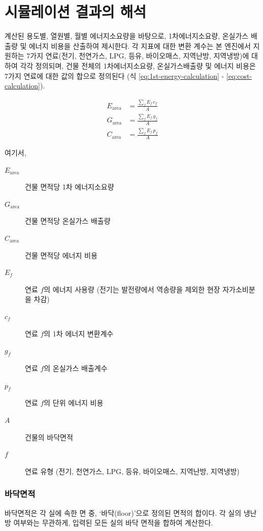 \chapter{시뮬레이션 결과의 해석}

\simulator\은 계산된 용도별, 열원별, 월별 에너지소요량을 바탕으로, 1차에너지소요량, 온실가스 배출량 및 에너지 비용을 산출하여 제시한다. 각 지표에 대한 변환 계수는 본 엔진에서 지원하는 7가지 연료(전기, 천연가스, LPG, 등유, 바이오매스, 지역난방, 지역냉방)에 대하여 각각 정의되며, 건물 전체의 1차에너지소요량, 온실가스배출량 및 에너지 비용은 7가지 연료에 대한 값의 합으로 정의된다 (식 \ref{eq:1st-energy-calculation} - \ref{eq:cost-calculation}).

\begin{align}
E_{\mathrm{area}} &= \frac{\sum_{f} E_f \, c_f}{A} \label{eq:1st-energy-calculation} \\
G_{\mathrm{area}} &= \frac{\sum_{f} E_f \, g_f}{A} \label{eq:ghg-calculation} \\
C_{\mathrm{area}} &= \frac{\sum_{f} E_f \, p_f}{A} \label{eq:cost-calculation}
\end{align}

여기서,

\begin{description}
\item[$E_{\mathrm{area}}$] 건물 면적당 1차 에너지소요량
\item[$G_{\mathrm{area}}$] 건물 면적당 온실가스 배출량
\item[$C_{\mathrm{area}}$] 건물 면적당 에너지 비용
\item[$E_f$] 연료 $f$의 에너지 사용량 (전기는 발전량에서 역송량을 제외한 현장 자가소비분을 차감)
\item[$c_f$] 연료 $f$의 1차 에너지 변환계수
\item[$g_f$] 연료 $f$의 온실가스 배출계수
\item[$p_f$] 연료 $f$의 단위 에너지 비용
\item[$A$] 건물의 바닥면적
\item[$f$] 연료 유형 (전기, 천연가스, LPG, 등유, 바이오매스, 지역난방, 지역냉방)
\end{description}

\subsection{바닥면적} \label{subsec:floorarea_definition_for_EUI}

바닥면적은 각 실에 속한 면 중, `바닥(floor)'으로 정의된 면적의 합이다. 각 실의 냉난방 여부와는 무관하게, 입력된 모든 실의 바닥 면적을 합하여 계산한다.

